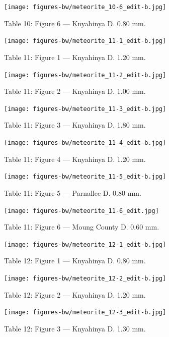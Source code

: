\documentclass[a4paper, 12pt, oneside]{article}
\begin{document}
\clearpage
\begin{figure}[t]
\texttt{[image: figures-bw/meteorite\_10-6\_edit-b.jpg]}
\caption{Table 10: Figure 6 --- Knyahinya D. 0.80 mm.}
\centering
\end{figure}
\clearpage
{}
\begin{figure}[t]
\texttt{[image: figures-bw/meteorite\_11-1\_edit-b.jpg]}
\caption{Table 11: Figure 1 --- Knyahinya D. 1.20 mm.}
\centering
\end{figure}
\clearpage
\begin{figure}[t]
\texttt{[image: figures-bw/meteorite\_11-2\_edit-b.jpg]}
\caption{Table 11: Figure 2 --- Knyahinya D. 1.00 mm.}
\centering
\end{figure}
\clearpage
\begin{figure}[t]
\texttt{[image: figures-bw/meteorite\_11-3\_edit-b.jpg]}
\caption{Table 11: Figure 3 --- Knyahinya D. 1.80 mm.}
\centering
\end{figure}
\clearpage
\begin{figure}[t]
\texttt{[image: figures-bw/meteorite\_11-4\_edit-b.jpg]}
\caption{Table 11: Figure 4 --- Knyahinya D. 1.20 mm.}
\centering
\end{figure}
\clearpage
\begin{figure}[t]
\texttt{[image: figures-bw/meteorite\_11-5\_edit-b.jpg]}
\caption{Table 11: Figure 5 --- Parnallee D. 0.80 mm.}
\centering
\end{figure}
\clearpage
\begin{figure}[t]
\texttt{[image: figures-bw/meteorite\_11-6\_edit.jpg]}
\caption{Table 11: Figure 6 --- Moung County D. 0.60 mm.}
\centering
\end{figure}
\clearpage
{}
\begin{figure}[t]
\texttt{[image: figures-bw/meteorite\_12-1\_edit-b.jpg]}
\caption{Table 12: Figure 1 --- Knyahinya D. 0.80 mm.}
\centering
\end{figure}
\clearpage
\begin{figure}[t]
\texttt{[image: figures-bw/meteorite\_12-2\_edit-b.jpg]}
\caption{Table 12: Figure 2 --- Knyahinya D. 1.20 mm.}
\centering
\end{figure}
\clearpage
\begin{figure}[t]
\texttt{[image: figures-bw/meteorite\_12-3\_edit-b.jpg]}
\caption{Table 12: Figure 3 --- Knyahinya D. 1.30 mm.}
\centering
\end{figure}
\end{document}

